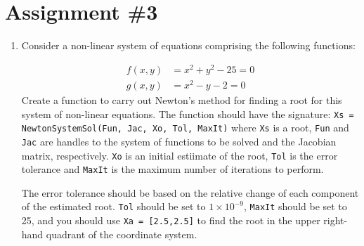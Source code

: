 \chapter{Assignment \#3}
\label{ch:ass3n}

\begin{fullwidth}






\begin{enumerate}

\item Consider a non-linear system of equations comprising the following functions:


\begin{align*}
f(x,y) &= x^2 + y^2 - 25 = 0 \\
g(x,y) &= x^2 - y - 2 = 0
\end{align*}
Create a function to carry out Newton's method for finding a root for this system of non-linear equations.  The function should have the signature: \lstinline[style=myMatlab]{Xs = NewtonSystemSol(Fun, Jac, Xo, Tol, MaxIt)} where \lstinline[style=myMatlab]{Xs} is a root, \lstinline[style=myMatlab]{Fun} and \lstinline[style=myMatlab]{Jac} are handles to the system of functions to be solved and the Jacobian matrix, respectively.  \lstinline[style=myMatlab]{Xo} is an initial estiimate of the root, \lstinline[style=myMatlab]{Tol} is the error tolerance and \lstinline[style=myMatlab]{MaxIt} is the maximum number of iterations to perform.  

The error tolerance should be based on the relative change of each component of the estimated root. \lstinline[style=myMatlab]{Tol} should be set to $1 \times 10^{-9}$, \lstinline[style=myMatlab]{MaxIt} should be set to 25, and you should use \lstinline[style=myMatlab]{Xa = [2.5,2.5]} to find the root in the upper right-hand quadrant of the coordinate system.




\end{enumerate}
\end{fullwidth}
